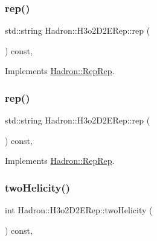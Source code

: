 \subsubsection{\texorpdfstring{rep()}{rep()}\hspace{0.1cm}{\footnotesize\ttfamily [2/3]}}
{\footnotesize\ttfamily std\+::string Hadron\+::\+H3o2\+D2\+E\+Rep\+::rep (\begin{DoxyParamCaption}{ }\end{DoxyParamCaption}) const\hspace{0.3cm}{\ttfamily [inline]}, {\ttfamily [virtual]}}



Implements \mbox{\hyperlink{structHadron_1_1RepRep_ab3213025f6de249f7095892109575fde}{Hadron\+::\+Rep\+Rep}}.

\mbox{\label{structHadron_1_1H3o2D2ERep_a62c37bd67dbe2ba7fd36b57f0a069aa7}} 
\subsubsection{\texorpdfstring{rep()}{rep()}\hspace{0.1cm}{\footnotesize\ttfamily [3/3]}}
{\footnotesize\ttfamily std\+::string Hadron\+::\+H3o2\+D2\+E\+Rep\+::rep (\begin{DoxyParamCaption}{ }\end{DoxyParamCaption}) const\hspace{0.3cm}{\ttfamily [inline]}, {\ttfamily [virtual]}}



Implements \mbox{\hyperlink{structHadron_1_1RepRep_ab3213025f6de249f7095892109575fde}{Hadron\+::\+Rep\+Rep}}.

\mbox{\label{structHadron_1_1H3o2D2ERep_a834909b5a05a1e80078eec2e2349831b}} 
\subsubsection{\texorpdfstring{twoHelicity()}{twoHelicity()}\hspace{0.1cm}{\footnotesize\ttfamily [1/2]}}
{\footnotesize\ttfamily int Hadron\+::\+H3o2\+D2\+E\+Rep\+::two\+Helicity (\begin{DoxyParamCaption}{ }\end{DoxyParamCaption}) const\hspace{0.3cm}{\ttfamily [inline]}, {\ttfamily [virtual]}}

